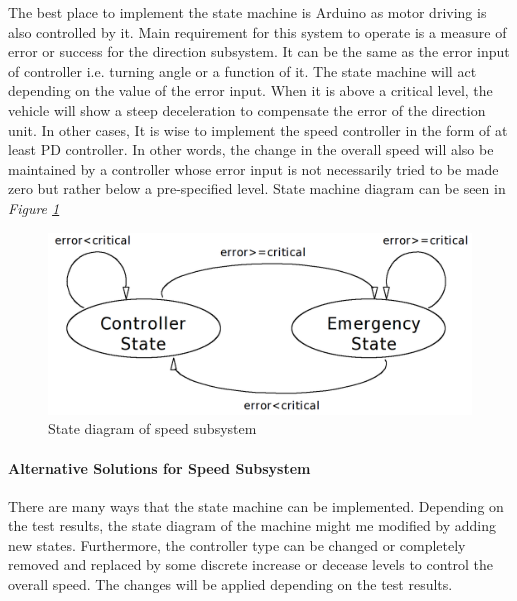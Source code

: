 \documentclass[a4paper,12pt]{article}
\begin{document}
	The best place to implement the state machine is Arduino as motor driving is also controlled by it. Main requirement for this system to operate is a measure of error or success for the direction subsystem. It can be the same as the error input of controller i.e. turning angle or a function of it. The state machine will act depending on the value of the error input. When it is above a critical level, the vehicle will show a steep deceleration to compensate the error of the direction unit. In other cases, It is wise to implement the speed controller in the form of at least PD controller. In other words, the change in the overall speed will also be maintained by a controller whose error input is not necessarily tried to be made zero but rather below a pre-specified level. State machine diagram can be seen in \textit{Figure \ref{fig:speed-state}}\\
	\begin{figure}[h]
		\includegraphics[width=.6\textwidth,center]{images/speed-state.png}
		\caption{State diagram of speed subsystem}\label{fig:speed-state}
	\end{figure}
	
	\paragraph{Alternative Solutions for Speed Subsystem}
	There are many ways that the state machine can be implemented. Depending on the test results, the state diagram of the machine might me modified by adding new states. Furthermore, the controller type can be changed or completely removed and replaced by some discrete increase or decease levels to control the overall speed. The changes will be applied depending on the test results.
\end{document}
